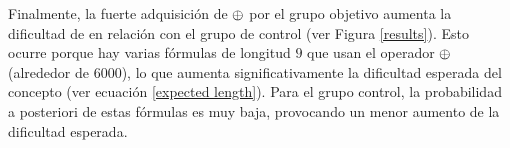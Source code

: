 Finalmente, la fuerte adquisición de $ \oplus $ por el grupo objetivo aumenta la dificultad de \testb en relación con el grupo de control (ver Figura \ref{results}). Esto ocurre porque hay varias fórmulas de longitud $9$ que usan el operador $ \oplus $ (alrededor de $6000$), lo que aumenta significativamente la dificultad esperada del concepto (ver ecuación \eqref{expected length}). Para el grupo control, la probabilidad a posteriori de estas fórmulas es muy baja, provocando un menor aumento de la dificultad esperada.

